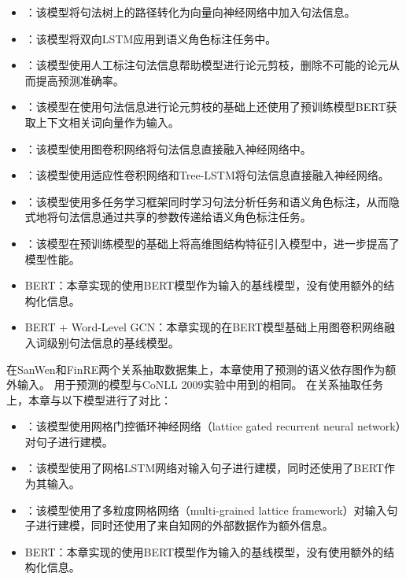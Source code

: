 \begin{itemize}
    \item \citet{roth-lapata-2016-neural}：该模型将句法树上的路径转化为向量向神经网络中加入句法信息。
    \item \citet{marcheggiani-etal-2017-simple}：该模型将双向LSTM应用到语义角色标注任务中。
    \item \citet{he-etal-2018-syntax}：该模型使用人工标注句法信息帮助模型进行论元剪枝，删除不可能的论元从而提高预测准确率。
    \item \citet{he-etal-2019-syntax}：该模型在使用句法信息进行论元剪枝的基础上还使用了预训练模型BERT获取上下文相关词向量作为输入。
    \item \citet{li-etal-2018-unified}：该模型使用图卷积网络将句法信息直接融入神经网络中。
    \item \citet{munir-etal-2021-adaptive}：该模型使用适应性卷积网络和Tree-LSTM将句法信息直接融入神经网络。
    \item \citet{xia-etal-2019-syntax}：该模型使用多任务学习框架同时学习句法分析任务和语义角色标注，从而隐式地将句法信息通过共享的参数传递给语义角色标注任务。
    \item \citet{li-etal-2020-high}：该模型在预训练模型的基础上将高维图结构特征引入模型中，进一步提高了模型性能。
    \item BERT：本章实现的使用BERT模型作为输入的基线模型，没有使用额外的结构化信息。
    \item BERT + Word-Level GCN：本章实现的在BERT模型基础上用图卷积网络融入词级别句法信息的基线模型。
\end{itemize}

在SanWen和FinRE两个关系抽取数据集上，本章使用了预测的语义依存图作为额外输入。
用于预测的模型与CoNLL 2009实验中用到的相同。
在关系抽取任务上，本章与以下模型进行了对比：
\begin{itemize}
    \item \citet{xu-etal-2020-chinese}：该模型使用网格门控循环神经⽹络（lattice gated recurrent neural network）对句子进行建模。
    \item \citet{zhang-yu-2020-chinese}：该模型使用了网格LSTM网络对输入句子进行建模，同时还使用了BERT作为其输入。
    \item \citet{li-etal-2019-chinese}：该模型使用了多粒度网格网络（multi-grained lattice framework）对输入句子进行建模，同时还使用了来自知网的外部数据作为额外信息。
    \item BERT：本章实现的使用BERT模型作为输入的基线模型，没有使用额外的结构化信息。
\end{itemize}

